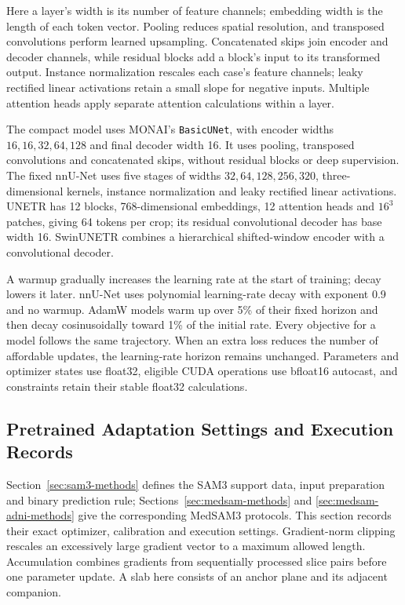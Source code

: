 \documentclass[12pt,a4paper]{article}
\begin{document}
Here a layer's width is its number of feature channels; embedding width is
the length of each token vector. Pooling reduces spatial resolution, and
transposed convolutions perform learned upsampling. Concatenated skips join
encoder and decoder channels, while residual blocks add a block's input to
its transformed output. Instance normalization rescales each case's feature
channels; leaky rectified linear activations retain a small slope for
negative inputs. Multiple attention heads apply separate attention
calculations within a layer.

The compact model uses MONAI's \texttt{BasicUNet}, with encoder widths
$16,16,32,64,128$ and final decoder width 16. It uses pooling, transposed
convolutions and concatenated skips, without residual blocks or deep
supervision. The fixed nnU-Net uses five stages of widths
$32,64,128,256,320$, three-dimensional kernels, instance normalization and
leaky rectified linear activations. UNETR has 12 blocks, 768-dimensional
embeddings, 12 attention heads and $16^3$ patches, giving 64 tokens per
crop; its residual convolutional decoder has base width 16. SwinUNETR
combines a hierarchical shifted-window encoder with a convolutional decoder.


A warmup gradually increases the learning rate at the start of training;
decay lowers it later. nnU-Net uses polynomial learning-rate decay with
exponent 0.9 and no warmup. AdamW models warm up over 5\% of their fixed horizon and then
decay cosinusoidally toward 1\% of the initial rate. Every objective
for a model follows the same trajectory. When an extra loss reduces
the number of affordable updates, the learning-rate horizon remains
unchanged. Parameters and optimizer states use float32, eligible CUDA
operations use bfloat16 autocast, and constraints retain their stable
float32 calculations.

\subsection{Pretrained Adaptation Settings and Execution Records}
\label{sec:adaptation-implementation}

Section~\ref{sec:sam3-methods} defines the SAM3 support data, input
preparation and binary prediction rule; Sections~\ref{sec:medsam-methods}
and \ref{sec:medsam-adni-methods} give the corresponding MedSAM3 protocols.
This section records their exact optimizer, calibration and execution
settings. Gradient-norm clipping rescales an excessively large gradient
vector to a maximum allowed length. Accumulation combines gradients from
sequentially processed slice pairs before one parameter update. A slab here
consists of an anchor plane and its adjacent companion.
\end{document}
